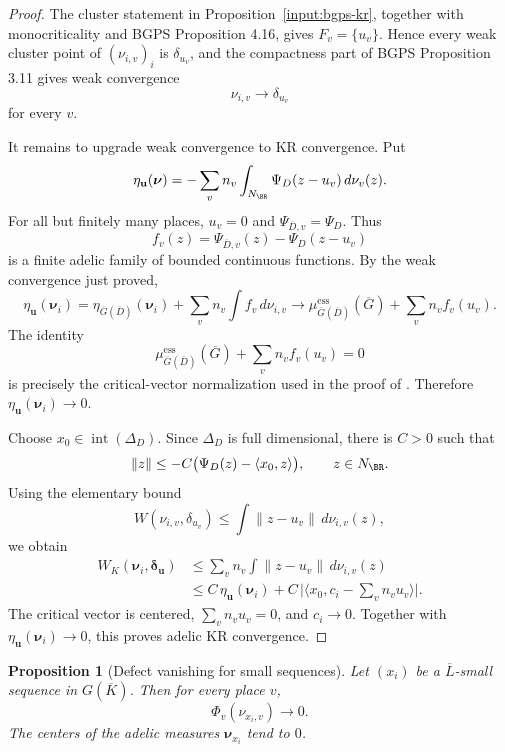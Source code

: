 \documentclass[10pt,a4paper]{amsart}
\theoremstyle{plain}
\newtheorem{proposition}[theorem]{Proposition}
\theoremstyle{plain}
\numberwithin{equation}{section}
\providecommand{\bD}{\overline{D}}
\providecommand{\bL}{\overline{L}}
\providecommand{\muess}{\mu^{\mathrm{ess}}}
\begin{document}
\begin{proof}
	The cluster statement in Proposition~\ref{input:bgps-kr}, together with
	monocriticality and BGPS Proposition 4.16, gives \(F_v=\{u_v\}\).  Hence every
	weak cluster point of \((\nu_{i,v})_i\) is \(\delta_{u_v}\), and the compactness
	part of BGPS Proposition 3.11 gives weak convergence
	\[
	\nu_{i,v}\longrightarrow\delta_{u_v}
	\]
	for every \(v\).
	
	It remains to upgrade weak convergence to KR convergence.  Put
	\[
	\eta_{\mathbf u}(\boldsymbol\nu)
	=-\sum_v n_v\int_{N_\BR}\Psi_D(z-u_v)\,d\nu_v(z).
	\]
	For all but finitely many places, \(u_v=0\) and
	\(\Psi_{\bD,v}=\Psi_D\).  Thus
	\[
	f_v(z)=\Psi_{\bD,v}(z)-\Psi_D(z-u_v)
	\]
	is a finite adelic family of bounded continuous functions.  By the weak
	convergence just proved,
	\[
	\eta_{\mathbf u}(\boldsymbol\nu_i)
	=\eta_{\overline G(\bD)}(\boldsymbol\nu_i)
	+\sum_v n_v\int f_v\,d\nu_{i,v}
	\longrightarrow
	\muess_{\overline G(\bD)}(\overline G)+\sum_vn_vf_v(u_v).
	\]
	The identity
	\[
	\muess_{\overline G(\bD)}(\overline G)+\sum_vn_vf_v(u_v)=0
	\]
	is precisely the critical-vector normalization used in the proof of
	\cite[Theorem 4.19]{BGPS19}.  Therefore
	\(\eta_{\mathbf u}(\boldsymbol\nu_i)\to0\).
	
	Choose \(x_0\in\operatorname{int}(\Delta_D)\).  Since \(\Delta_D\) is full
	dimensional, there is \(C>0\) such that
	\[
	\|z\|\le -C\bigl(\Psi_D(z)-\langle x_0,z\rangle\bigr),
	\qquad z\in N_\BR.
	\]
	Using the elementary bound
	\[
	W(\nu_{i,v},\delta_{u_v})
	\le \int\|z-u_v\|\,d\nu_{i,v}(z),
	\]
	we obtain
	\[
	\begin{aligned}
		W_K(\boldsymbol\nu_i,\boldsymbol\delta_{\mathbf u})
		&\le \sum_v n_v\int\|z-u_v\|\,d\nu_{i,v}(z)\\
		&\le C\,\eta_{\mathbf u}(\boldsymbol\nu_i)
		+C\,\bigl|\langle x_0,c_i-\sum_vn_vu_v\rangle\bigr|.
	\end{aligned}
	\]
	The critical vector is centered, \(\sum_v n_vu_v=0\), and \(c_i\to0\).
	Together with \(\eta_{\mathbf u}(\boldsymbol\nu_i)\to0\), this proves
	adelic KR convergence.
\end{proof}

\begin{proposition}[Defect vanishing for small sequences]
	\label{prop:bgps-defect-vanishing}
	Let \((x_i)\) be a \(\bL\)-small sequence in \(G(\overline K)\).  Then for every
	place \(v\),
	\[
	\Phi_v(\nu_{x_i,v})\longrightarrow0.
	\]
	The centers of the adelic measures \(\boldsymbol\nu_{x_i}\) tend to \(0\).
\end{proposition}
\end{document}
